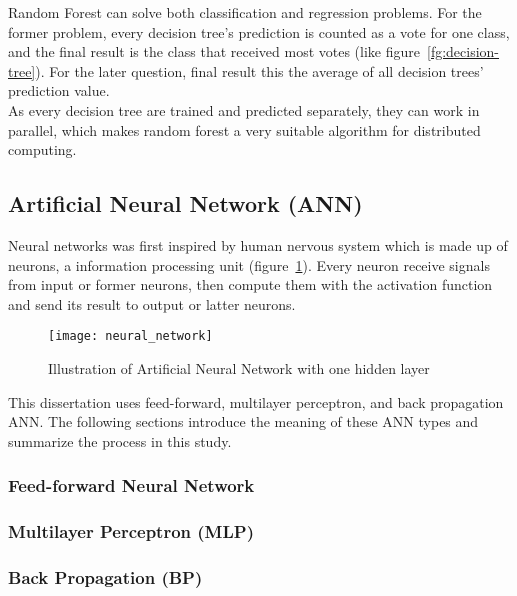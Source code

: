Random Forest can solve both classification and regression problems. For the former problem, every decision tree's prediction is counted as a vote for one class, and the final result is the class that received most votes (like figure~\ref{fg:decision-tree}). For the later question, final result this the average of all decision trees' prediction value.\\


As every decision tree are trained and predicted separately, they can work in parallel, which makes random forest a very suitable algorithm for distributed computing.


\subsection{Artificial Neural Network (ANN)}
Neural networks was first inspired by human nervous system which is made up of neurons, a information processing unit (figure~\ref{fg:neural-nework}). Every neuron receive signals from input or former neurons, then compute them with the activation function and send its result to output or latter neurons\cite{russell2003artificial}.
\begin{figure}[h]
	\centering
	\texttt{[image: neural\_network]}
	\caption{Illustration of Artificial Neural Network with one hidden layer}
	\label{fg:neural-nework}
\end{figure}

This dissertation uses feed-forward, multilayer perceptron, and back propagation ANN. The following sections introduce the meaning of these ANN types and summarize the process in this study.

\subsubsection{Feed-forward Neural Network}

\subsubsection{Multilayer Perceptron (MLP)}

\subsubsection{Back Propagation (BP)}


